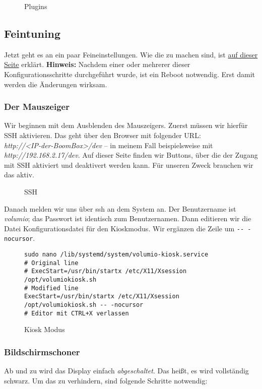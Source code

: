 \documentclass[12pt,a4paper]{article}
\newcommand{\code}[1]{\texttt{#1}}
\newcommand{\jpaimg}[2]{\begin{figure}[H]\centering\fbox{\texttt{[image: \#1]}}\caption{#2}\label{fig:#2}\end{figure}}
\begin{document}
\jpaimg{./../images/vol-plug-active.png}{Plugins}

\newpage
\subsection{Feintuning}\label{subsec:Feintuning}
Jetzt geht es an ein paar Feineinstellungen. Wie die zu machen sind, ist \href{https://volumio.org/forum/guide-for-setting-touchscreen-backlight-control-t11425.html}{auf dieser Seite}
erklärt. \textbf{Hinweis:} Nachdem einer oder mehrerer dieser Konfigurationsschritte durchgeführt wurde, ist ein Reboot notwendig. Erst damit werden die
Änderungen wirksam.

\subsubsection{Der Mauszeiger}\label{subsubsec:SSH}
Wir beginnen mit dem Ausblenden des Mauszeigers. Zuerst müssen wir hierfür SSH aktivieren. Das geht über den Browser mit folgender URL:\@ \\
\textit{http://<IP-der-BoomBox>/dev} -- in meinem Fall beispielsweise mit \\ \textit{http://192.168.2.17/dev}. Auf dieser Seite finden wir Buttons, über die der
Zugang mit SSH aktiviert und deaktivert werden kann. Für unseren Zweck brauchen wir das aktiv.

\jpaimg{./../images/vol-dev.png}{SSH}

\newpage
Danach melden wir uns über ssh an dem System an. Der Benutzername ist \textit{volumio}; das Passwort ist identisch zum Benutzernamen. Dann editieren wir die
Datei Konfigurationsdatei für den Kioskmodus. Wir ergänzen die Zeile um \code{-{}- -nocursor}.

\begin{figure}[H]
\begin{lstlisting}
sudo nano /lib/systemd/system/volumio-kiosk.service
# Original line
# ExecStart=/usr/bin/startx /etc/X11/Xsession /opt/volumiokiosk.sh
# Modified line
ExecStart=/usr/bin/startx /etc/X11/Xsession /opt/volumiokiosk.sh -- -nocursor
# Editor mit CTRL+X verlassen
\end{lstlisting}
\caption{Kiosk Modus}\label{fig:Kiosk Modus}
\end{figure}

\subsubsection{Bildschirmschoner}
Ab und zu wird das Display einfach \textit{abgeschaltet}. Das heißt, es wird vollständig schwarz. Um das zu verhindern, sind folgende Schritte notwendig:
\end{document}
